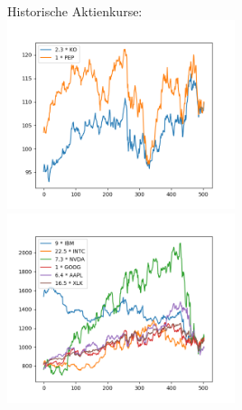 \documentclass[12pt]{article}
\begin{document}
	\\
	Historische Aktienkurse:
	\\
	\includegraphics[width=0.5\textwidth]{Teil1_hist_2y}	
	\includegraphics[width=0.5\textwidth]{Teil2_hist_2y}	
	
	
	
\end{document}
